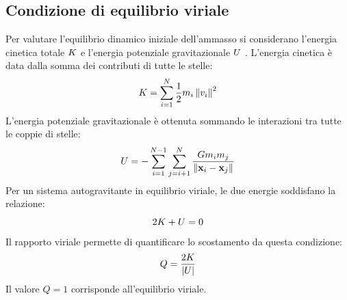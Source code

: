 \subsection{Condizione di equilibrio viriale}
\label{subsec:equilibrio-viriale}
Per valutare l'equilibrio dinamico iniziale dell'ammasso si considerano l'energia cinetica totale $K$ e l'energia potenziale gravitazionale $U$ \cite{ciotti2021}. L'energia cinetica è data dalla somma dei contributi di tutte le stelle:
\begin{equation}
	K = \sum_{i=1}^{N}\frac{1}{2}m_i\left\|v_i\right\|^2
	\label{eq:kinetic-energy}
\end{equation}
L'energia potenziale gravitazionale è ottenuta sommando le interazioni tra tutte le coppie di stelle:
\begin{equation}
	U = -\sum_{i=1}^{N-1}\sum_{j=i+1}^{N}
	\frac{G m_i m_j}{\left\|\mathbf{x}_i-\mathbf{x}_j\right\|}
	\label{eq:gravitational-potential-energy}
\end{equation}
Per un sistema autogravitante in equilibrio viriale, le due energie soddisfano la relazione:
\begin{equation}
	2K+U=0
	\label{eq:virial-theorem}
\end{equation}
Il rapporto viriale permette di quantificare lo scostamento da questa condizione:
\begin{equation}
	Q=\frac{2K}{|U|}
	\label{eq:virial-ratio}
\end{equation}
Il valore $Q=1$ corrisponde all'equilibrio viriale.
